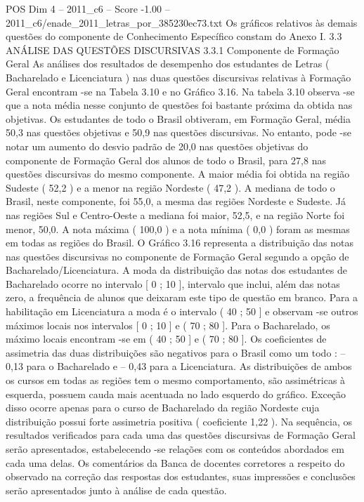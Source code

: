 \begin{textsample}{POS Dim 4 – 2011\_c6 – Score -1.00 – 2011\_c6/enade\_2011\_letras\_por\_385230ec73.txt}
Os gráficos relativos às demais questões do componente de Conhecimento Específico constam do Anexo I. 3.3 ANÁLISE DAS QUESTÕES DISCURSIVAS 3.3.1 Componente de Formação Geral As análises dos resultados de desempenho dos estudantes de Letras ( Bacharelado e Licenciatura ) nas duas questões discursivas relativas à Formação Geral encontram -se na Tabela 3.10 e no Gráfico 3.16.
Na tabela 3.10 observa -se que a nota média nesse conjunto de questões foi bastante próxima da obtida nas objetivas.
Os estudantes de todo o Brasil obtiveram, em Formação Geral, média 50,3 nas questões objetivas e 50,9 nas questões discursivas.
No entanto, pode -se notar um aumento do desvio padrão de 20,0 nas questões objetivas do componente de Formação Geral dos alunos de todo o Brasil, para 27,8 nas questões discursivas do mesmo componente.
A maior média foi obtida na região Sudeste ( 52,2 ) e a menor na região Nordeste ( 47,2 ).
A mediana de todo o Brasil, neste componente, foi 55,0, a mesma das regiões Nordeste e Sudeste.
Já nas regiões Sul e Centro-Oeste a mediana foi maior, 52,5, e na região Norte foi menor, 50,0.
A nota máxima ( 100,0 ) e a nota mínima ( 0,0 ) foram as mesmas em todas as regiões do Brasil.
O Gráfico 3.16 representa a distribuição das notas nas questões discursivas no componente de Formação Geral segundo a opção de Bacharelado/Licenciatura.
A moda da distribuição das notas dos estudantes de Bacharelado ocorre no intervalo [ 0 ; 10 ], intervalo que inclui, além das notas zero, a frequência de alunos que deixaram este tipo de questão em branco.
Para a habilitação em Licenciatura a moda é o intervalo ( 40 ; 50 ] e observam -se outros máximos locais nos intervalos [ 0 ; 10 ] e ( 70 ; 80 ].
Para o Bacharelado, os máximo locais encontram -se em ( 40 ; 50 ] e ( 70 ; 80 ].
Os coeficientes de assimetria das duas distribuições são negativos para o Brasil como um todo : – 0,13 para o Bacharelado e – 0,43 para a Licenciatura.
As distribuições de ambos os cursos em todas as regiões tem o mesmo comportamento, são assimétricas à esquerda, possuem cauda mais acentuada no lado esquerdo do gráfico.
Exceção disso ocorre apenas para o curso de Bacharelado da região Nordeste cuja distribuição possui forte assimetria positiva ( coeficiente 1,22 ).
Na sequência, os resultados verificados para cada uma das questões discursivas de Formação Geral serão apresentados, estabelecendo -se relações com os conteúdos abordados em cada uma delas.
Os comentários da Banca de docentes corretores a respeito do observado na correção das respostas dos estudantes, suas impressões e conclusões serão apresentados junto à análise de cada questão.

\end{textsample}

